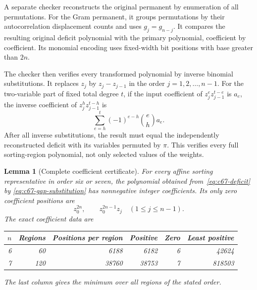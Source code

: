 \documentclass[11pt,a4paper]{article}
\newtheorem{lemma}[theorem]{Lemma}
\theoremstyle{definition}
\theoremstyle{remark}
\begin{document}
A separate checker reconstructs the original permanent by enumeration
of all permutations. For the Gram permanent, it groups permutations by
their autocorrelation displacement counts and uses $g_j=g_{n-j}$.
It compares the resulting original deficit polynomial with the primary
polynomial, coefficient by coefficient.
Its monomial encoding uses fixed-width bit positions with base greater
than $2n$.

The checker then verifies every transformed polynomial by inverse
binomial substitutions. It replaces $z_j$ by $z_j-z_{j-1}$ in the order
$j=1,2,\ldots,n-1$. For the two-variable part of fixed total degree $t$,
if the input coefficient of $z_j^ez_{j-1}^{t-e}$ is $a_e$, the inverse
coefficient of $z_j^hz_{j-1}^{t-h}$ is
\begin{equation}\label{eq:c67-inverse-binomial}
 \sum_{e=h}^{t}(-1)^{e-h}\binom eh a_e.
\end{equation}
After all inverse substitutions, the result must equal the independently
reconstructed deficit with its variables permuted by $\pi$.
This verifies every full sorting-region polynomial, not only selected
values of the weights.

\begin{lemma}[Complete coefficient certificate]\label{lem:c67-certificate}
For every affine sorting representative in order six or seven, the
polynomial obtained from~\eqref{eq:c67-deficit} by
\eqref{eq:c67-gap-substitution} has nonnegative integer coefficients.
Its only zero coefficient positions are
\[
 z_0^{2n},\qquad z_0^{2n-1}z_j\quad(1\le j\le n-1).
\]
The exact coefficient data are
\begin{center}
\small
\begin{tabular}{rrrrrr}
\toprule
$n$ & Regions & Positions per region & Positive & Zero & Least positive\\
\midrule
6 & 60 & 6188 & 6182 & 6 & 42624\\
7 & 120 & 38760 & 38753 & 7 & 818503\\
\bottomrule
\end{tabular}
\end{center}
The last column gives the minimum over all regions of the stated order.
\end{lemma}
\end{document}
